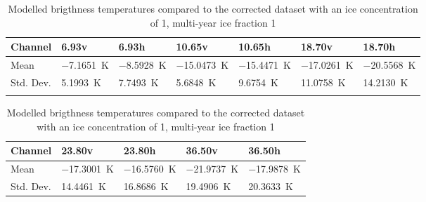 \documentclass[11pt, a4paper]{article}
\begin{document}
\begin{table}[h!]
\centering
\begin{tabular}{@{} l l l l l l l @{}}
Channel & 6.93v & 6.93h & 10.65v & 10.65h & 18.70v & 18.70h \\
\midrule
Mean & \SI{-7.1651}{K} & \SI{-8.5928}{K} & \SI{-15.0473}{K} & \SI{-15.4471}{K} & \SI{-17.0261}{K} & \SI{-20.5568}{K} \\
Std. Dev. & \SI{5.1993}{K} & \SI{7.7493}{K} & \SI{5.6848}{K} & \SI{9.6754}{K} & \SI{11.0758}{K} & \SI{14.2130}{K} \\
\midrule
\tabularnewline
\end{tabular}
\begin{tabular}{@{} l l l l l @{}}
Channel & 23.80v & 23.80h & 36.50v & 36.50h \\
\midrule
Mean & \SI{-17.3001}{K} & \SI{-16.5760}{K} & \SI{-21.9737}{K} & \SI{-17.9878}{K} \\
Std. Dev. & \SI{14.4461}{K} & \SI{16.8686}{K} & \SI{19.4906}{K} & \SI{20.3633}{K}  \\
\midrule
\end{tabular}
\caption{Modelled brigthness temperatures compared to the corrected dataset with an ice concentration of 1, multi-year ice fraction 1}
\label{tab:for1_1}
\end{table}
\end{document}
